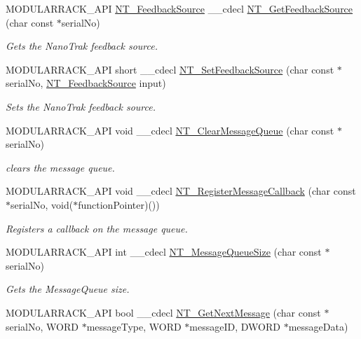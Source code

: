 \begin{DoxyCompactItemize}
M\+O\+D\+U\+L\+A\+R\+R\+A\+C\+K\+\_\+\+A\+PI \hyperlink{group___common_ga603b9807ada27df33a5ff4a7d293e40c}{N\+T\+\_\+\+Feedback\+Source} \+\_\+\+\_\+cdecl \hyperlink{group___modular_nano_trak_ga4cdc9f6ec05be64de6d5b9570102867a}{N\+T\+\_\+\+Get\+Feedback\+Source} (char const $\ast$serial\+No)
\begin{DoxyCompactList}\small\item\em Gets the Nano\+Trak feedback source. \end{DoxyCompactList}\item 
M\+O\+D\+U\+L\+A\+R\+R\+A\+C\+K\+\_\+\+A\+PI short \+\_\+\+\_\+cdecl \hyperlink{group___modular_nano_trak_gac7a093e23b0488bf12eee3c8c7599387}{N\+T\+\_\+\+Set\+Feedback\+Source} (char const $\ast$serial\+No, \hyperlink{group___common_ga603b9807ada27df33a5ff4a7d293e40c}{N\+T\+\_\+\+Feedback\+Source} input)
\begin{DoxyCompactList}\small\item\em Sets the Nano\+Trak feedback source. \end{DoxyCompactList}\item 
M\+O\+D\+U\+L\+A\+R\+R\+A\+C\+K\+\_\+\+A\+PI void \+\_\+\+\_\+cdecl \hyperlink{group___modular_nano_trak_gaf944ce68436b597eb29f9d3ea125f4d4}{N\+T\+\_\+\+Clear\+Message\+Queue} (char const $\ast$serial\+No)
\begin{DoxyCompactList}\small\item\em clears the message queue. \end{DoxyCompactList}\item 
M\+O\+D\+U\+L\+A\+R\+R\+A\+C\+K\+\_\+\+A\+PI void \+\_\+\+\_\+cdecl \hyperlink{group___modular_nano_trak_gaabe78fca4e2db517f09b063f976acc19}{N\+T\+\_\+\+Register\+Message\+Callback} (char const $\ast$serial\+No, void($\ast$function\+Pointer)())
\begin{DoxyCompactList}\small\item\em Registers a callback on the message queue. \end{DoxyCompactList}\item 
M\+O\+D\+U\+L\+A\+R\+R\+A\+C\+K\+\_\+\+A\+PI int \+\_\+\+\_\+cdecl \hyperlink{group___modular_nano_trak_ga9134a3c34e6906655e19d1380afc3d76}{N\+T\+\_\+\+Message\+Queue\+Size} (char const $\ast$serial\+No)
\begin{DoxyCompactList}\small\item\em Gets the Message\+Queue size. \end{DoxyCompactList}\item 
M\+O\+D\+U\+L\+A\+R\+R\+A\+C\+K\+\_\+\+A\+PI bool \+\_\+\+\_\+cdecl \hyperlink{group___modular_nano_trak_ga3956187f061efe665f2f8be8f018ba53}{N\+T\+\_\+\+Get\+Next\+Message} (char const $\ast$serial\+No, W\+O\+RD $\ast$message\+Type, W\+O\+RD $\ast$message\+ID, D\+W\+O\+RD $\ast$message\+Data)

\end{DoxyCompactItemize}

